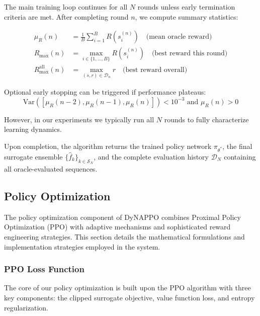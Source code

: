 \documentclass[conference]{IEEEtran}
\begin{document}
The main training loop continues for all $N$ rounds unless early termination criteria are met. After completing round $n$, we compute summary statistics:

\begin{align}
\mu_R(n) &= \frac{1}{B}\sum_{i=1}^{B} R(s_i^{(n)}) \quad \text{(mean oracle reward)} \\
R_{\max}(n) &= \max_{i \in \{1,\ldots,B\}} R(s_i^{(n)}) \quad \text{(best reward this round)} \\
R_{\max}^{\text{all}}(n) &= \max_{(s,r) \in \mathcal{D}_n} r \quad \text{(best reward overall)}
\end{align}

Optional early stopping can be triggered if performance plateaus:
\begin{equation}
\text{Var}([\mu_R(n-2), \mu_R(n-1), \mu_R(n)]) < 10^{-3} \text{ and } \mu_R(n) > 0
\end{equation}

However, in our experiments we typically run all $N$ rounds to fully characterize learning dynamics.

Upon completion, the algorithm returns the trained policy network $\pi_{\theta^*}$, the final surrogate ensemble $\{\hat{f}_k\}_{k \in \mathcal{S}_N}$, and the complete evaluation history $\mathcal{D}_N$ containing all oracle-evaluated sequences.








\subsection{Policy Optimization}

The policy optimization component of DyNAPPO combines Proximal Policy Optimization (PPO) with adaptive mechanisms and sophisticated reward engineering strategies. This section details the mathematical formulations and implementation strategies employed in the system.

\subsubsection{PPO Loss Function}

The core of our policy optimization is built upon the PPO algorithm with three key components: the clipped surrogate objective, value function loss, and entropy regularization.
\end{document}
